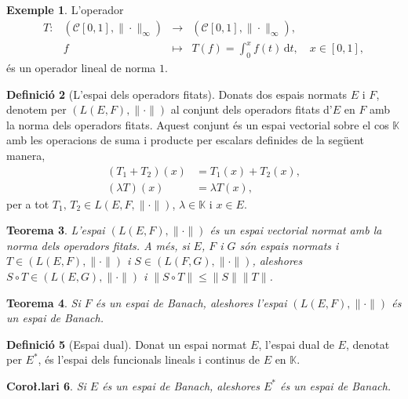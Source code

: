 \documentclass[12pt]{book}
\newtheorem{teorema}{Teorema}[chapter]
\newtheorem{coro}[teorema]{Coro\l.lari}
\theoremstyle{definition}
\newtheorem{defi}[teorema]{Definició}
\theoremstyle{nota}
\theoremstyle{exemple}
\newtheorem{exemple}[teorema]{Exemple}
\begin{document}
\begin{exemple}
  L'operador
  \[
    \begin{array}{lrcl}
      T :
      & (\mathcal{C}[0,1], \|\cdot\|_\infty) & \longrightarrow
      & (\mathcal{C}[0,1], \|\cdot\|_\infty), \\
      & f &\longmapsto
      & T(f) = \int_0^x f(t)\, \mathrm{d}t, \quad x \in [0,1],
    \end{array}
  \]
  és un operador lineal de norma $1$.
\end{exemple}

\begin{defi}[L'espai dels operadors fitats]
  Donats dos espais normats $E$ i $F$, denotem per
  $(L(E,F), \|\cdot\|)$ al conjunt dels operadors fitats d'$E$ en $F$
  amb la norma dels operadors fitats. Aquest conjunt és un espai
  vectorial sobre el cos $\mathbb{K}$ amb les operacions de suma i
  producte per escalars definides de la següent manera,
  \begin{align*}
    (T_1 + T_2)(x) &= T_1(x) + T_2(x), \\
    (\lambda T)(x) &= \lambda T(x),
  \end{align*}
  per a tot $T_1,\, T_2 \in L(E, F, \|\cdot\|)$,
  $\lambda \in \mathbb{K}$ i $x \in E$.
\end{defi}

\begin{teorema}
  L'espai $(L(E,F), \|\cdot\|)$ és un espai vectorial normat amb la
  norma dels operadors fitats. A més, si $E$, $F$ i $G$ són espais
  normats i $T \in (L(E,F), \|\cdot\|)$ i $S \in (L(F,G), \|\cdot\|)$,
  aleshores $S \circ T \in (L(E,G), \|\cdot\|)$ i
  $\|S \circ T\| \leq \|S\| \|T\|$.
\end{teorema}

\begin{teorema}
  Si $F$ és un espai de Banach, aleshores l'espai
  $(L(E,F), \|\cdot\|)$ és un espai de Banach.
\end{teorema}

\begin{defi}[Espai dual]
  Donat un espai normat $E$, l'espai dual de $E$, denotat per $E^*$,
  és l'espai dels funcionals lineals i continus de $E$ en
  $\mathbb{K}$.
\end{defi}

\begin{coro}
  Si $E$ és un espai de Banach, aleshores $E^*$ és un espai de Banach.
\end{coro}
\end{document}
